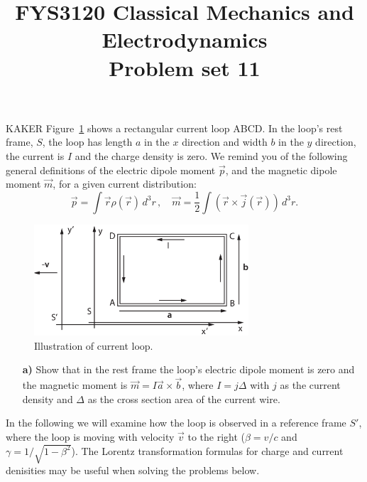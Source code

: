 \documentclass[11pt,a4paper]{report}
\title{FYS3120 Classical Mechanics and Electrodynamics\\ 
\vspace{15mm}Problem set 11}
\newcounter{excount}[chapter]
\newenvironment{exercise}[1][]{\addtocounter{excount}{1} \noindent {\bf Problem
    \arabic{excount} \ \ #1}\hspace{2mm}}{\vspace{4mm}}
\begin{document}
\maketitle


\begin{exercise}
KAKER
Figure~\ref{fig:currentloop} shows a rectangular current loop ABCD. In the loop's rest frame, $S$, the loop has length $a$ in the $x$ direction and width $b$ in the $y$ direction, the current is $I$ and the charge density is zero. We remind you of the following general definitions of the electric dipole moment $\vec p$, and the magnetic dipole moment $\vec m$, for a given current distribution:
\begin{equation}
\vec p=\int\vec r\rho(\vec r)\,d^3r\,,\quad\vec m=\frac{1}{2}\int(\vec r\times \vec j(\vec r))\,d^3r.
\end{equation}

\begin{figure}[h]
\begin{center}
\includegraphics[width=8cm]{currentloop.eps}
\end{center}
\caption{Illustration of current loop. \label{fig:currentloop}}
\end{figure}

\begin{itemize}
\item[{\bf a)}] Show that in the rest frame the loop's electric dipole moment is zero and the magnetic moment is $\vec m=I\vec a\times \vec b$, where $I=j\Delta$ with $j$ as the current density and $\Delta$ as the cross section area of the current wire.
\end{itemize}

In the following we will examine how the loop is observed in a reference frame $S'$, where the loop is moving with velocity $\vec v$ to the right ($\beta=v/c$ and $\gamma=1/\sqrt{1-\beta^2}$). The Lorentz transformation formulas for charge and current denisities may be useful when solving the problems below.


\end{exercise}
\end{document}
